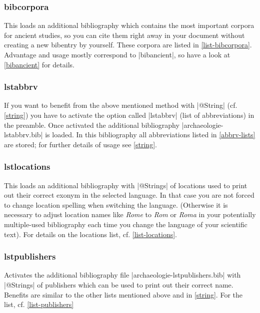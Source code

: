 \documentclass[a4paper,
10pt,
greek,
french,
spanish,
italian,
ngerman,
english,
]{ltxdoc}
\begin{document}

\subsubsection{bibcorpora}\label{bibcorpora}
This loads an additional bibliography which contains the most important corpora for ancient studies, so you can cite them right away in your document without creating a new bibentry by yourself. 
These corpora are listed in \cref{list-bibcorpora}. 
Advantage and usage mostly correspond to |bibancient|, 
so have a look at \cref{bibancient} for details.



\subsubsection{lstabbrv}\label{abbrv}
If you want to benefit from the above mentioned method with |@String| (cf. \cref{string}) 
you have to activate the option called |lstabbrv| (list of abbreviations) in the preamble.
Once activated the additional bibliography |archaeologie-lstabbrv.bib| is loaded. 
In this bibliography all abbreviations listed in \cref{abbrv-lists} are stored; 
for further details of usage see \cref{string}.

\subsubsection{lstlocations}\label{lstlocations}
This loads an additional bibliography with |@Strings| of locations used to print out their correct exonym in the selected language. 
In that case you are not forced to change location spelling when switching the language. 
(Otherwise it is necessary to adjust location names like \emph{Rome} to \emph{Rom} or \emph{Roma} 
in your potentially multiple-used bibliography each time you change the language of your scientific text).
For details on the locations list, cf. \cref{list-locations}.

\subsubsection{lstpublishers}\label{lstpublishers}
Activates the additional bibliography file |archaeologie-lstpublishers.bib| with |@Strings| 
of publishers which can be used to print out their correct name. 
Benefits are similar to the other lists mentioned above and in \cref{string}.
For the list, cf. \cref{list-publishers}
\end{document}
